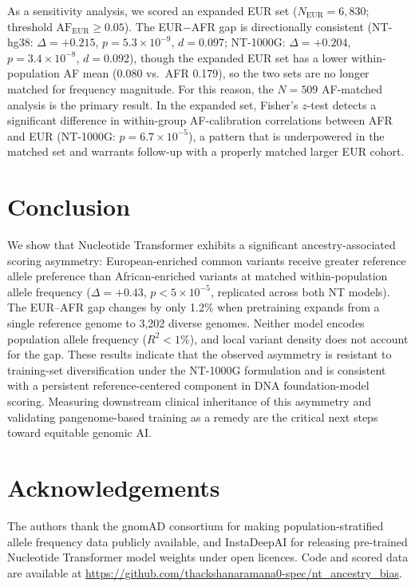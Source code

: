 \documentclass[conference]{IEEEtran}
\begin{document}
As a sensitivity analysis, we scored an expanded EUR set ($N_\text{EUR}{=}6{,}830$;
threshold $\text{AF}_\text{EUR}{\geq}0.05$). The EUR$-$AFR gap is directionally
consistent (NT-hg38: $\Delta{=}{+}0.215$, $p{=}5.3{\times}10^{-9}$, $d{=}0.097$;
NT-1000G: $\Delta{=}{+}0.204$, $p{=}3.4{\times}10^{-8}$, $d{=}0.092$), though
the expanded EUR set has a lower within-population AF mean (0.080 vs.\ AFR 0.179),
so the two sets are no longer matched for frequency magnitude. For this reason,
the $N{=}509$ AF-matched analysis is the primary result. In the expanded set,
Fisher's $z$-test detects a significant difference in within-group AF-calibration
correlations between AFR and EUR (NT-1000G: $p{=}6.7{\times}10^{-5}$), a pattern
that is underpowered in the matched set and warrants follow-up with a properly
matched larger EUR cohort.

\section{Conclusion}

We show that Nucleotide Transformer exhibits a significant ancestry-associated
scoring asymmetry: European-enriched common variants receive greater reference
allele preference than African-enriched variants at matched within-population
allele frequency ($\Delta{=}{+}0.43$, $p{<}5{\times}10^{-5}$, replicated
across both NT models). The EUR--AFR gap changes by only 1.2\% when pretraining
expands from a single reference genome to 3{,}202 diverse genomes. Neither model
encodes population allele frequency ($R^2{<}1\%$), and local variant density
does not account for the gap. These results indicate that the observed asymmetry
is resistant to training-set diversification under the NT-1000G formulation and
is consistent with a persistent reference-centered component in DNA
foundation-model scoring. Measuring downstream clinical inheritance of this asymmetry and validating
pangenome-based training as a remedy are the critical next steps toward
equitable genomic AI.

\section*{Acknowledgements}
The authors thank the gnomAD consortium for making population-stratified allele
frequency data publicly available, and InstaDeepAI for releasing pre-trained
Nucleotide Transformer model weights under open licences. Code and scored data
are available at \url{https://github.com/thackshanaramana0-spec/nt_ancestry_bias}.



\end{document}
